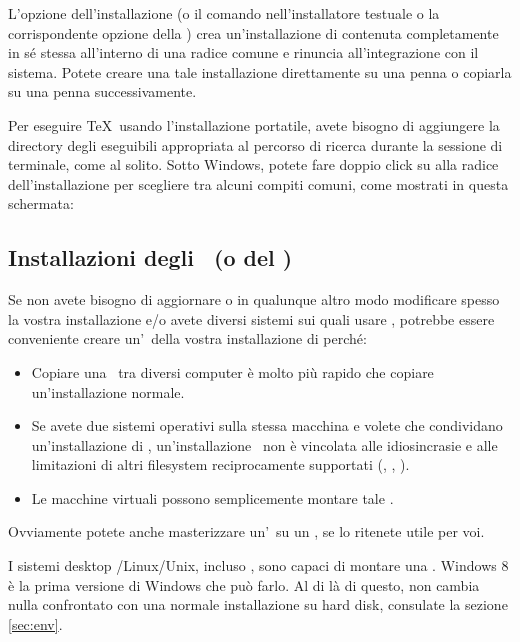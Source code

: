 \documentclass{article}
\begin{document}
L'opzione  dell'installazione (o il comando 
nell'installatore testuale o la corrispondente opzione della \GUI) crea
un'installazione di \TL{} contenuta completamente in sé stessa all'interno
di una radice comune e rinuncia all'integrazione con il sistema. Potete
creare una tale installazione direttamente su una penna \USB{} o copiarla su
una penna \USB{} successivamente.

Per eseguire \TeX\ usando l'installazione portatile, avete bisogno di
aggiungere la directory degli eseguibili appropriata al percorso di ricerca
durante la sessione di terminale, come al solito. Sotto Windows, potete fare
doppio click su  alla radice dell'installazione per
scegliere tra alcuni compiti comuni, come mostrati in questa schermata:

\medskip
{}
\smallskip


\subsection{Installazioni degli \ISO\ (o del \DVD)}
\label{sec:isoinstall}

Se non avete bisogno di aggiornare o in qualunque altro modo modificare
spesso la vostra installazione e\slash o avete diversi sistemi sui quali
usare \TL, potrebbe essere conveniente creare un'\ISO\ della vostra
installazione di \TL{} perché:

\begin{itemize}
\item Copiare una \ISO\ tra diversi computer è molto più rapido che copiare
  un'installazione normale.
\item Se avete due sistemi operativi sulla stessa macchina e volete che
  condividano un'installazione di \TL, un'installazione \ISO\ non è
  vincolata alle idiosincrasie e alle limitazioni di altri filesystem
  reciprocamente supportati (, , ).
\item Le macchine virtuali possono semplicemente montare tale \ISO.
\end{itemize}

Ovviamente potete anche masterizzare un'\ISO\ su un \DVD, se lo ritenete
utile per voi.

I sistemi desktop \GNU/Linux/Unix, incluso \MacOSX, sono capaci di montare
una \ISO. Windows 8 è la prima versione di Windows che può farlo. Al di là
di questo, non cambia nulla confrontato con una normale
installazione su hard disk, consulate la sezione \ref{sec:env}.
\end{document}
